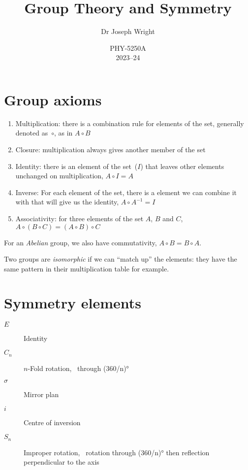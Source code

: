 \documentclass[12pt]{article}
\title{Group Theory and Symmetry}
\author{Dr Joseph Wright\\\email{joseph.wright@uea.ac.uk}}
\date{PHY-5250A\\2023--24}
\begin{document}
\maketitle

\section{Group axioms}

\begin{enumerate}
  \item Multiplication: there is a combination rule for elements of the set,
    generally denoted as~$\circ$, as in $A \circ B$
  \item Closure: multiplication always gives another member of the set
  \item Identity: there is an element of the set~($I$) that leaves other elements
    unchanged on multiplication, $A \circ I = A$
  \item Inverse: For each element of the set, there is a element we can combine
    it with that will give us the identity, $A \circ A^{-1} = I$
  \item Associativity: for three elements of the set $A$, $B$ and $C$,
    $A \circ (B \circ C) = (A \circ B) \circ  C$
\end{enumerate}

For an \emph{Abelian} group, we also have commutativity, $A \circ B = B \circ A$.

Two groups are \emph{isomorphic} if we can \enquote{match up} the elements:
they have the same pattern in their multiplication table for example.

\section{Symmetry elements}

\begin{description}
  \item[$E$] Identity
  \item[$C_{n}$] $n$-Fold rotation, ~through
    \ang[parse-numbers = false]{(360/n)}
  \item[$\sigma$] Mirror plan
  \item[$i$] Centre of inversion
  \item[$S_{n}$] Improper rotation, ~rotation through
    \ang[parse-numbers = false]{(360/n)} then reflection
    perpendicular to the axis
\end{description}
\end{document}
